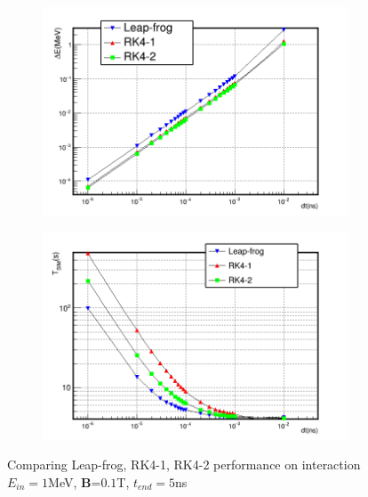 \documentclass[a4paper,oneside,12pt]{report}
\numberwithin{equation}{chapter}
\begin{document}
\begin{figure}[H]
    \captionsetup[subfigure]{justification=centering}
    \captionsetup{justification=centering}
    \centering
    \begin{subfigure}{0.9\textwidth}
        \centering
        \includegraphics[width=\linewidth]{./figures/analiz/lf_rk1_rk2_dt-E_3.png}
    \end{subfigure}
    
    \begin{subfigure}{0.9\textwidth}
        \centering
        \includegraphics[width=\linewidth]{./figures/analiz/lf_rk1_rk2_dt-Tsim_3.png}
    \end{subfigure}
    \caption{Comparing Leap-frog, RK4-1, RK4-2 performance on \eB interaction\\ $E_{in}=1$MeV, \textbf{B}=$0.1$T, $t_{end}=5$ns}
    \label{fig:lf_rk1_rk2_comparison}
\end{figure}
\end{document}
